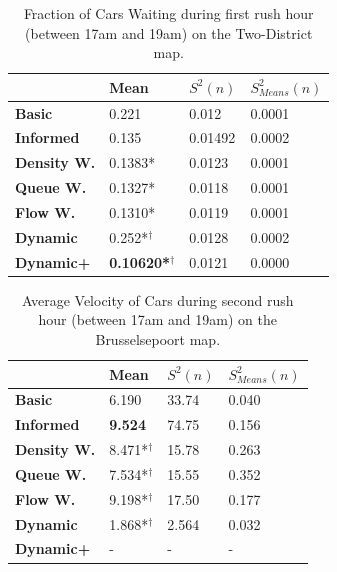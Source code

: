 \documentclass[11pt]{article}
\begin{document}
\begin{table}[H]
\centering
\caption{Fraction of Cars Waiting during first rush hour (between 17am and 19am) on the Two-District map.}
\label{my-label}
\begin{tabular}{l|l|l|l|}
\textbf{}                 & \textbf{Mean} & \textbf{$S^2(n)$} & \textbf{$S_{Means}^2(n)$} \\
\hline\textbf{Basic}      & 0.221            & 0.012             & 0.0001                     \\
\textbf{Informed}   & 0.135            & 0.01492           & 0.0002                     \\
\hline\textbf{Density W.} & 0.1383*           & 0.0123            & 0.0001                     \\
\textbf{Queue W.}   & 0.1327*           & 0.0118            & 0.0001                     \\
\textbf{Flow W.}    & 0.1310*           & 0.0119            & 0.0001                     \\
\textbf{Dynamic}    & 0.252*$^\dagger$            & 0.0128            & 0.0002                     \\
\textbf{Dynamic+}   & \textbf{0.10620*$^\dagger$} & 0.0121            & 0.0000                    
\end{tabular}
\end{table}

\begin{table}[H]
\centering
\caption{Average Velocity of Cars during second rush hour (between 17am and 19am) on the Brusselsepoort map.}
\label{my-label}
\begin{tabular}{l|l|l|l|}
\textbf{}                 & \textbf{Mean} & \textbf{$S^2(n)$} & \textbf{$S_{Means}^2(n)$} \\
\hline\textbf{Basic}            & 6.190          & 33.74             & 0.040                      \\
\textbf{Informed}         & \textbf{9.524} & 74.75             & 0.156                      \\
\hline\textbf{Density W.} & 8.471*$^\dagger$          & 15.78             & 0.263                      \\
\textbf{Queue W.}   & 7.534*$^\dagger$          & 15.55             & 0.352                      \\
\textbf{Flow W.}    & 9.198*$^\dagger$          & 17.50             & 0.177                      \\
\textbf{Dynamic}          & 1.868*$^\dagger$          & 2.564             & 0.032                      \\
\textbf{Dynamic+}         & -              & -                 & -                         
\end{tabular}
\end{table}
\end{document}
